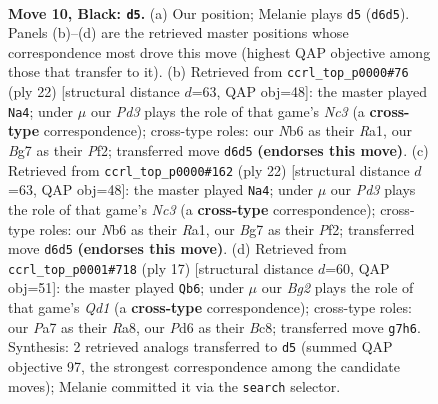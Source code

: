 \documentclass[11pt]{article}
\begin{document}
\clearpage

\begin{figure}[p]\centering
\begin{subfigure}{0.46\textwidth}\centering
\resizebox{\linewidth}{!}{%
\newchessgame
\chessboard[
  setfen={rnbq1rk1/pp3pbp/1n1pp1p1/8/3P4/1B1Q1N2/PPP2PPP/RNB1R1K1 b - - 3 10},
  showmover=false,
  pgfstyle=straightmove, color=movearrow, markmove={d6-d5}
]}
\caption{}
\end{subfigure}\hfill
\begin{subfigure}{0.46\textwidth}\centering
\resizebox{\linewidth}{!}{%
\newchessgame
\chessboard[
  setfen={r1b2rk1/pp2bppp/1qn1pn2/8/3P4/P1N2NP1/1P3PBP/R1BQ1RK1 w - - 1 12},
  showmover=false,
  pgfstyle=straightmove, color=movearrow, markmove={c3-a4}
]}
\caption{}
\end{subfigure}
\\[4pt]
\begin{subfigure}{0.46\textwidth}\centering
\resizebox{\linewidth}{!}{%
\newchessgame
\chessboard[
  setfen={r1b2rk1/pp2bppp/1qn1pn2/8/3P4/P1N2NP1/1P3PBP/R1BQ1RK1 w - - 1 12},
  showmover=false,
  pgfstyle=straightmove, color=movearrow, markmove={c3-a4}
]}
\caption{}
\end{subfigure}\hfill
\begin{subfigure}{0.46\textwidth}\centering
\resizebox{\linewidth}{!}{%
\newchessgame
\chessboard[
  setfen={r1bq1rk1/pp2ppbp/n4np1/2pP4/4P3/1QN2N2/PP3PPP/R1B1KB1R b KQ - 0 9},
  showmover=false,
  pgfstyle=straightmove, color=movearrow, markmove={d8-b6}
]}
\caption{}
\end{subfigure}
\caption{\textbf{Move 10, Black: \texttt{d5}.} (a) Our position; Melanie plays \texttt{d5} (\texttt{d6d5}). Panels (b)--(d) are the retrieved master positions whose correspondence most drove this move (highest QAP objective among those that transfer to it). (b) Retrieved from \texttt{ccrl\_top\_p0000\#76} (ply 22) [structural distance $d$=63, QAP obj=48]: the master played \texttt{Na4}; under $\mu$ our \emph{Pd3} plays the role of that game's \emph{Nc3} (a \textbf{cross-type} correspondence); cross-type roles: our \emph{N}b6 as their \emph{R}a1, our \emph{B}g7 as their \emph{P}f2; transferred move \texttt{d6d5} \textbf{(endorses this move)}. (c) Retrieved from \texttt{ccrl\_top\_p0000\#162} (ply 22) [structural distance $d$=63, QAP obj=48]: the master played \texttt{Na4}; under $\mu$ our \emph{Pd3} plays the role of that game's \emph{Nc3} (a \textbf{cross-type} correspondence); cross-type roles: our \emph{N}b6 as their \emph{R}a1, our \emph{B}g7 as their \emph{P}f2; transferred move \texttt{d6d5} \textbf{(endorses this move)}. (d) Retrieved from \texttt{ccrl\_top\_p0001\#718} (ply 17) [structural distance $d$=60, QAP obj=51]: the master played \texttt{Qb6}; under $\mu$ our \emph{Bg2} plays the role of that game's \emph{Qd1} (a \textbf{cross-type} correspondence); cross-type roles: our \emph{P}a7 as their \emph{R}a8, our \emph{P}d6 as their \emph{B}c8; transferred move \texttt{g7h6}. Synthesis: 2 retrieved analogs transferred to \texttt{d5} (summed QAP objective 97, the strongest correspondence among the candidate moves); Melanie committed it via the \texttt{search} selector.}
\label{fig:thought-m19}
\end{figure}
\end{document}
